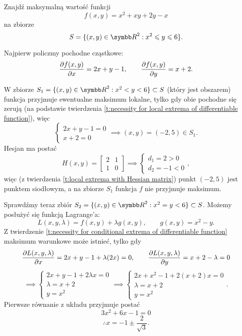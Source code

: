 \begin{example}
    Znajdź maksymalną wartość funkcji
    \[ f(x, y) = x^2 + xy + 2y - x \]
    na zbiorze
    \[ S = \{(x, y) \in \RR^2 : x^2 \leq y \leq 6\}. \]
\end{example}

\begin{solution}
    Najpierw policzmy pochodne cząstkowe:
    \[ \frac{\operatorname{\partial}\!{f}(x, y)}{\operatorname{\partial}\!{x}} = 2x + y - 1, \qquad \frac{\operatorname{\partial}\!{f}(x, y)}{\operatorname{\partial}\!{y}} = x + 2. \]

    W zbiorze $S_1 = \{(x, y) \in \RR^2 : x^2 < y < 6\} \subset S$ (który jest obszarem) funkcja przyjmuje ewentualne maksimum lokalne, tylko gdy obie pochodne się zerują (na podstawie twierdzenia \ref{t:necessity for local extrema of differentiable function}), więc
    \[ \begin{cases} 2x + y - 1 = 0 \\ x + 2 = 0 \end{cases} \implies (x, y) = (-2, 5) \in S_1. \]
    Hesjan ma postać
    \[ H(x, y) = \begin{bmatrix}
        2 & 1 \\
        1 & 0
    \end{bmatrix} \implies \begin{cases} d_1 = 2 > 0 \\ d_2 = -1 < 0 \end{cases}, \]
    więc (z twierdzenia \ref{t:local extrema with Hessian matrix}) punkt $(-2, 5)$ jest punktem siodłowym, a na zbiorze $S_1$ funkcja $f$ nie przyjmuje maksimum.

    Sprawdźmy teraz zbiór $S_2 = \{(x, y) \in \RR^2 : x^2 = y < 6\} \subset S$. Możemy posłużyć się funkcją Lagrange'a:
    \[ L(x, y, \lambda) = f(x, y) + \lambda g(x, y), \qquad g(x, y) = x^2 - y. \]
    Z twierdzenie \ref{t:necessity for conditional extrema of differentiable function} maksimum warunkowe może istnieć, tylko gdy
    \[ \frac{\operatorname{\partial}\!{L}(x, y, \lambda)}{\operatorname{\partial}\!{x}} = 2x + y - 1 + \lambda(2x) = 0, \qquad \frac{\operatorname{\partial}\!{L}(x, y, \lambda)}{\operatorname{\partial}\!{y}} = x + 2 - \lambda = 0 \]
    \[ \implies \begin{cases} 2x + y - 1 + 2\lambda x = 0 \\ \lambda = x + 2 \\ y = x^2 \end{cases} \implies \begin{cases} 2x + x^2 - 1 + 2(x+2)x = 0 \\ \lambda = x + 2 \\ y = x^2 \end{cases}. \]
    Pierwsze równanie z układu przyjmuje postać
    \[ 3x^2 + 6x - 1 = 0 \]
    \[ \therefore x = -1 \pm \frac{2}{\sqrt{3}}. \]


\end{solution}
